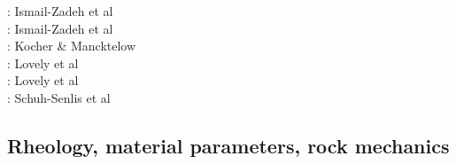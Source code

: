 \begin{scriptsize}
\twothousandone: Ismail-Zadeh et al \cite{istv01}\\
\twothousandfour: Ismail-Zadeh et al \cite{istt04}\\
\twothousandfive: Kocher \& Mancktelow \cite{koma05}\\
\twothousandtwelve: Lovely et al \cite{lofg12}\\
\twothousandeighteen: Lovely et al \cite{lojm18}\\
\twothousandtwenty: Schuh-Senlis et al \cite{sctc20}
\end{scriptsize}


\subsection{Rheology, material parameters, rock mechanics}

